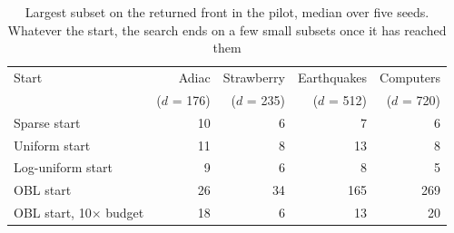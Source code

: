 \begin{table}[!tbp]
\caption{Largest subset on the returned front in the pilot, median over five seeds. Whatever the start, the search ends on a few small subsets once it has reached them}
\label{tab:pilot-fronts}
\centering
\small
\begin{tabular}{@{}lrrrr@{}}
\toprule
Start & Adiac & Strawberry & Earthquakes & Computers \\
 & ($d$ = 176) & ($d$ = 235) & ($d$ = 512) & ($d$ = 720) \\
\midrule
Sparse start & 10 & 6 & 7 & 6 \\
Uniform start & 11 & 8 & 13 & 8 \\
Log-uniform start & 9 & 6 & 8 & 5 \\
OBL start & 26 & 34 & 165 & 269 \\
OBL start, 10$\times$ budget & 18 & 6 & 13 & 20 \\
\bottomrule
\end{tabular}
\end{table}
